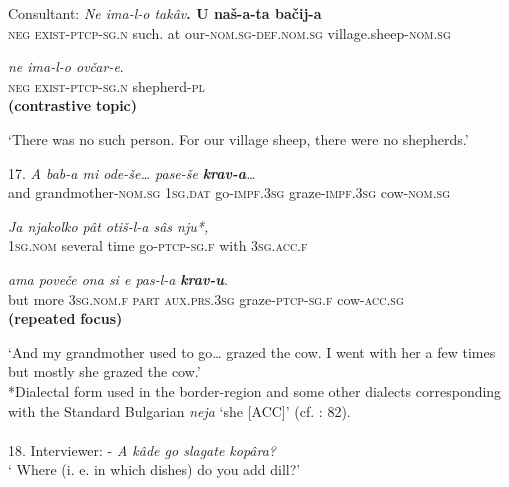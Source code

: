 \documentclass[output=paper]{langscibook}
\begin{document}
       Consultant:   \textit{Ne       ima-l-o                          takâv}\textbf{.  \textbf{U}  \textbf{naš-a-ta}                                \textbf{bačij-a}} \\
                              \textsc{neg}  \textsc{exist-ptcp-sg.n}           such.    at   our-\textsc{nom.sg-def.nom.sg}      village.sheep-\textsc{nom.sg}  

 \textit{ne        ima-l-o                         ovčar-e}.                  \\
                              \textsc{neg}  \textsc{exist-ptcp-sg.n}           shepherd-\textsc{pl}               \textbf{\\
}                                                                              \textbf{(contrastive} \textbf{topic)}

       ‘There was no such person. For our village sheep, there were no shepherds.’ 

17.  \textit{A     bab-a                        mi          ode-še…         pase-še} \textbf{\textit{krav-a}}\textit{…}      \\
      and  grandmother-\textsc{nom.sg}    1\textsc{sg}.\textsc{dat}  go-\textsc{impf.3sg}   graze-\textsc{impf.3sg}     cow-\textsc{nom.sg}

 \textit{Ja              njakolko    pât      otiš-l-a           sâs      nju*,}\\
    1\textsc{sg}.\textsc{nom}   several      time    go-\textsc{ptcp-sg.f}    with    \textsc{3sg}.\textsc{acc.f}

 \textit{ama poveče  ona                si         e                        pas-l-a} \textbf{\textit{krav-u}}.\\
    but   more     \textsc{3sg}.\textsc{nom.f}     \textsc{part}    \textsc{aux}.\textsc{prs.3sg}      graze{}-\textsc{ptcp-sg.f}          cow-\textsc{acc.sg}\textbf{\\
}                                                                            \textbf{(repeated} \textbf{focus)}  

‘And my grandmother used to go… grazed the cow. I went with her a few times but mostly she grazed the cow.’\\
*Dialectal form used in the border-region and some other dialects corresponding with the Standard Bulgarian \textit{neja} ‘she [ACC]’ (cf. \citealt{Todorov2002}: 82).                       \\
\\
18. Interviewer:   {}- \textit{A kâde go slagate kopâra?}\\
                                   ‘ Where (i. e. in which dishes) do you add dill?’
\end{document}
